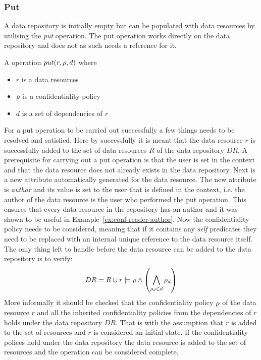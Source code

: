 \subsubsection{Put}\label{sec:put}
A data repository is initially empty but can be populated with data resources by utilising the \emph{put} operation. The put operation works directly on the data repository and does not as such needs a reference for it.
\begin{definition}
A operation $put(r, \rho, d)$ where
\begin{itemize}
  \item $r$ is a data resources
  \item $\rho$ is a confidentiality policy
  \item $d$ is a set of dependencies of $r$
\end{itemize}
\end{definition}
For a put operation to be carried out successfully a few things needs to be resolved and satisfied. Here by successfully it is meant that the data resource $r$ is successfully added to the set of data resources $R$ of the data repository $DR$. A prerequisite for carrying out a put operation is that the user is set in the context and that the data resource does not already exists in the data repository. Next is a new attribute automatically generated for the data resource. The new attribute is \emph{author} and its value is set to the user that is defined in the context, i.e. the author of the data resource is the user who performed the put operation. This ensures that every data resource in the repository has an author and it was shown to be useful in Example~\ref{ex:conf-reader-author}. Now the confidentiality policy needs to be considered, meaning that if it contains any \emph{self} predicates they need to be replaced with an internal unique reference to the data resource itself. The only thing left to handle before the data resource can be added to the data repository is to verify:
\begin{align*}
    DR = R \cup r \models \rho \land \left( \bigwedge\limits_{\rho_d \in d} \rho_d \right)
\end{align*}
More informally it should be checked that the confidentiality policy $\rho$ of the data resource $r$ and all the inherited confidentiality policies from the dependencies of $r$ holds under the data repository $DR$. That is with the assumption that $r$ is added to the set of resources and $r$ is considered an initial state. If the confidentiality polices hold under the data repository the data resource is added to the set of resources and the operation can be considered complete.


